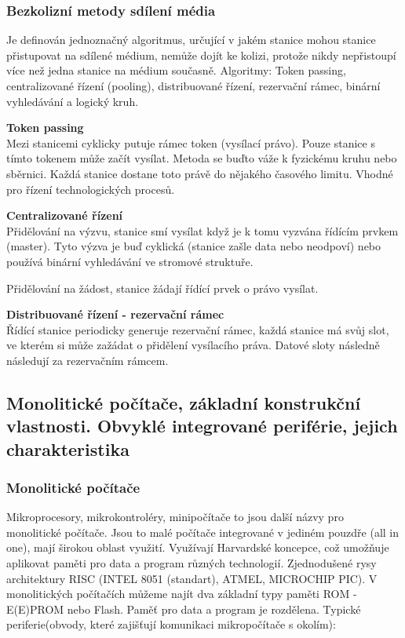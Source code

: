 \subsubsection{Bezkolizní metody sdílení média}
Je definován jednoznačný algoritmus, určující v jakém stanice mohou stanice přistupovat na sdílené médium, nemůže dojít ke kolizi, protože nikdy nepřistoupí více než jedna stanice na médium současně. Algoritmy: Token passing, centralizované řízení (pooling), distribuované řízení, rezervační rámec, binární vyhledávání a logický kruh.

\textbf{Token passing}\\ 
Mezi stanicemi cyklicky putuje rámec token (vysílací právo). Pouze stanice s tímto tokenem může začít vysílat. Metoda se buďto váže k fyzickému kruhu nebo sběrnici. Každá stanice dostane toto právě do nějakého časového limitu. Vhodné pro řízení technologických procesů.

\textbf{Centralizované řízení}\\ 
Přidělování na výzvu, stanice smí vysílat když je k tomu vyzvána řídícím prvkem (master). Tyto výzva je buď cyklická (stanice zašle data nebo neodpoví) nebo používá binární vyhledávání ve stromové struktuře.

Přidělování na žádost, stanice žádají řídící prvek o právo vysílat.

\textbf{Distribuované řízení - rezervační rámec} \\
Řídící stanice periodicky generuje rezervační rámec, každá stanice má svůj slot, ve kterém si může zažádat o přidělení vysílacího práva. Datové sloty následně následují za rezervačním rámcem.

\subsection[Monolitické počítače]{Monolitické počítače, základní konstrukční vlastnosti. Obvyklé integrované periférie, jejich charakteristika}
\subsubsection{Monolitické počítače}
Mikroprocesory, mikrokontroléry, minipočítače to jsou další názvy pro monolitické počítače. Jsou to malé počítače integrované v jediném pouzdře (all in one), mají širokou oblast využití. Využívají Harvardské koncepce, což umožňuje aplikovat paměti pro data a program různých technologií. Zjednodušené rysy architektury RISC (INTEL 8051 (standart), ATMEL, MICROCHIP PIC). V monolitických počítačích můžeme najít dva základní typy paměti ROM - E(E)PROM nebo Flash. Paměť pro data a program je rozdělena. Typické periferie(obvody, které zajišťují komunikaci mikropočítače s okolím):

